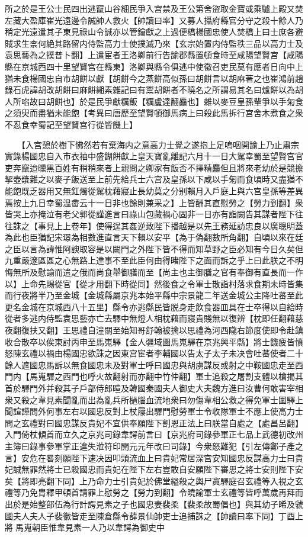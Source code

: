 所之於是王公士民四出逃竄山谷細民爭入宫禁及王公第舍盜取金寶或乘驢上殿又焚左藏大盈庫崔光遠邊令誠帥人救火【帥讀曰率】又募人攝府縣官分守之殺十餘人乃稍定光遠遣其子東見祿山令誠亦以管鑰獻之上過便橋楊國忠使人焚橋上曰士庶各避賊求生柰何絶其路留内侍監高力士使撲滅乃來【玄宗始置内侍監秩三品以高力士及袁思藝為之撲普卜翻】上遣宦者王洛卿前行告諭郡縣置頓食時至咸陽望賢宫【咸陽縣在京城西四十里望賢宫在縣東】洛卿與縣令俱逃中使徵召吏民莫有應者日向中上猶未食楊國忠自市胡餅以獻【胡餅今之蒸餅高似孫曰胡餅言以胡麻著之也崔鴻前趙錄石虎諱胡改胡餅曰麻餅緗素雜記曰有鬻胡餅者不曉名之所謂易其名曰爐餅以為胡人所啗故曰胡餅也】於是民爭獻糲飯【糲盧達翻麤也】雜以麥豆皇孫輩爭以手匊食之須臾而盡猶未能飽【考異曰唐歷至望賢頓御馬病上曰殺此馬拆行宫舍木煮食之衆不忍食幸蜀記至望賢宫行從皆饑上】

　　【入宫憩於樹下怫然若有棄海内之意高力士覺之遂抱上足嗚咽開諭上乃止肅宗實錄楊國忠自入市衣袖中盛餬餅獻上皇天寶亂離記六月十一日大駕幸蜀至望賢宫官吏奔竄迨曛黑百姓有稍稍來者上親問之卿家有飯否不擇精麤但且將來老幼於是競擔挈壺漿雜之以麥子飯送至上前先給兵士六宫及皇孫以下咸以手匊而食頃時又盡猶不能飽既乏器用又無釭燭從駕枕藉寢止長幼莫之分别賴月入戶庭上與六宫皇孫等差異焉按上九日幸蜀温畬云十一日非也餘則兼采之】上皆酬其直慰勞之【勞力到翻】衆皆哭上亦掩泣有老父郭從謹進言曰祿山包藏禍心固非一日亦有詣闕告其謀者陛下往往誅之【事見上上卷年】使得逞其姦逆致陛下播越是以先王務延訪忠良以廣聰明蓋為此也臣猶記宋璟為相數進直言天下賴以安平【為于偽翻數所角翻】自頃以來在廷之臣以言為諱惟阿諛取容是以闕門之外陛下皆不得而知草野之臣必知有今日久矣但九重嚴邃區區之心無路上達事不至此臣何由得睹陛下之面而訴之乎上曰此朕之不明悔無所及慰諭而遣之俄而尚食舉御膳而至【尚主也主御膳之官有奉御有直長而一作以】上命先賜從官【從才用翻下時從同】然後食之令軍士散詣村落求食期未時皆集而行夜將半乃至金城【金城縣屬京兆本始平縣中宗景龍二年送金城公主降吐蕃至此更名金城在京城西八十五里】縣令亦逃縣民皆脱身走飲食器皿具在士卒得以自給時從者多逃内侍監袁思藝亦亡去驛中無燈人相枕藉而寢貴賤無以復辨【枕即任翻藉慈夜翻復扶又翻】王思禮自潼關至始知哥舒翰被擒以思禮為河西隴右節度使即令赴鎮收合散卒以俟東討丙申至馬嵬驛【金人疆域圖馬嵬驛在京兆興平縣】將士饑疲皆憤怒陳玄禮以禍由楊國忠欲誅之因東宫宦者李輔國以告太子太子未决會吐蕃使者二十餘人遮國忠馬訴以無食國忠未及對軍士呼曰國忠與胡虜謀反或射之中鞍國忠走至西門内【馬嵬驛之西門也呼火故翻射而亦翻中竹仲翻】軍士追殺之屠割支體以槍揭其首於驛門外并殺其子戶部侍郎暄及韓國秦國夫人御史大夫魏方進曰汝曹何敢害宰相衆又殺之韋見素聞亂而出為亂兵所檛腦血流地衆曰勿傷韋相公救之得免軍士圍驛上聞諠譁問外何事左右以國忠反對上杖屨出驛門慰勞軍士令收隊軍士不應上使高力士問之玄禮對曰國忠謀反貴妃不宜供奉願陛下割恩正法上曰朕當自處之【處昌呂翻】入門倚杖傾首而立久之京兆司錄韋諤前言曰【京兆府司錄參軍正七品上武德初改州主簿曰錄事參軍掌正違失涖符印開元元年改曰司錄】今衆怒難犯【引左傳鄭子產之言】安危在晷刻願陛下速决因叩頭流血上曰貴妃常居深宫安知國忠反謀高力士曰貴妃誠無罪然將士已殺國忠而貴妃在陛下左右豈敢自安願陛下審思之將士安則陛下安矣【將即亮翻下同】上乃命力士引貴妃於佛堂縊殺之輿尸寘驛庭召玄禮等入視之玄禮等乃免胄釋甲頓首請罪上慰勞之【勞力到翻】令曉諭軍士玄禮等皆呼萬歲再拜而出於是始整部伍為行計諤見素之子也國忠妻裴柔【裴柔故蜀倡也】與其幼子晞及虢國夫人夫人子裴徽皆走至陳倉縣令薛景仙帥吏士追捕誅之【帥讀曰率下同】丁酉上將馬嵬朝臣惟韋見素一人乃以韋諤為御史中